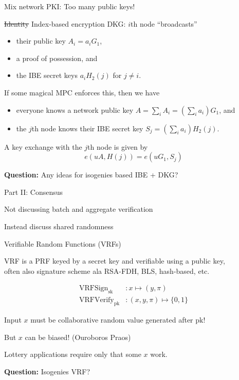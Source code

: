 \documentclass[fleqn,xcolor={usenames,dvipsnames},notes,aspectratio=169]{beamer} %
\begin{document}
\begin{frame}{Mix network PKI: Too many public keys!}

\sout{Identity} Index-based encryption DKG:
$i$th node ``broadcasts''
\begin{itemize}
\item their public key $A_i = a_i G_1$, 
\item a proof of possession, and
\item the IBE secret keys $a_i H_2(j)$ for $j \neq i$.
\end{itemize}
If some magical MPC enforces this, then we have
\begin{itemize}
\item everyone knows a network public key $A = \sum_i A_i = (\sum_i a_i) G_1$, and
\item the $j$th node knows their IBE secret key $S_j = (\sum_i a_i) H_2(j)$.
\end{itemize}
A key exchange with the $j$th node is given by
$$ e(u A,H(j)) = e(u G_1,S_j) $$

\medskip

{\bf Question:}  Any ideas for isogenies based IBE + DKG?

\end{frame}


\begin{frame}{Part II:  Consensus}

Not discussing batch and aggregate verification

\bigskip
\hspace{20pt}Instead discuss shared randomness

\end{frame}


\begin{frame}[t]{Verifiable Random Functions (VRFs)}

VRF is a PRF keyed by a secret key and verifiable using a public key, \\
often also signature scheme ala RSA-FDH, BLS, hash-based, etc.

\begin{align*}
\mathrm{VRFSign}_{\mathrm{sk}} &: x \mapsto (y,\pi) \\
\mathrm{VRFVerify}_{\mathrm{pk}} &: (x,y,\pi) \mapsto \{0,1\} 
\end{align*}

\medskip

Input $x$ must be collaborative random value generated after $\mathrm{pk}$!

\medskip

\hspace{30pt} But $x$ can be biased!  (Ouroboros Praos)

\bigskip

Lottery applications require only that some $x$ work.

\bigskip
\bigskip

{\bf Question:}  Isogenies VRF?

\end{frame}
\end{document}

